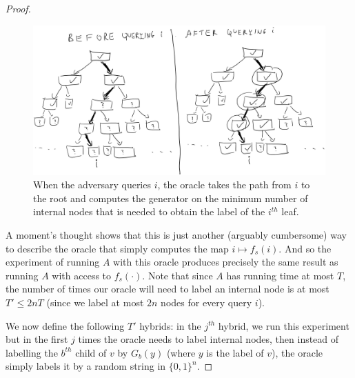 \begin{proof}
\begin{figure}
\centering
\includegraphics[width=\textwidth, height=0.25\paperheight, keepaspectratio]{../figure/prf-oracle-step.jpg}
\caption{When the adversary queries \(i\), the oracle takes the path
from \(i\) to the root and computes the generator on the minimum number
of internal nodes that is needed to obtain the label of the \(i^{th}\)
leaf.}
\label{oracleevaltreefig}
\end{figure}

A moment's thought shows that this is just another (arguably cumbersome)
way to describe the oracle that simply computes the map
\(i\mapsto f_s(i)\). And so the experiment of running \(A\) with this
oracle produces precisely the same result as running \(A\) with access
to \(f_s(\cdot)\). Note that since \(A\) has running time at most \(T\),
the number of times our oracle will need to label an internal node is at
most \(T' \leq 2nT\) (since we label at most \(2n\) nodes for every
query \(i\)).

We now define the following \(T'\) hybrids: in the \(j^{th}\) hybrid, we
run this experiment but in the first \(j\) times the oracle needs to
label internal nodes, then instead of labelling the \(b^{th}\) child of
\(v\) by \(G_b(y)\) (where \(y\) is the label of \(v\)), the oracle
simply labels it by a random string in \(\{0,1\}^n\).



\end{proof}
